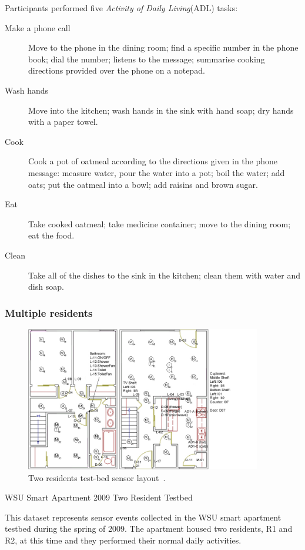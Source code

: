 \documentclass[12pt, a4paper, pdflatex, leqno, twoside, openright]{report}
\begin{document}
Participants performed five \emph{Activity of Daily Living}(ADL) tasks:
\begin{description}
\item[Make a phone call] Move to the phone in the dining room; find a specific number in the phone book; dial the number; listens to the message; summarise cooking directions provided over the phone on a notepad.
\item[Wash hands] Move into the kitchen; wash hands in the sink with hand soap; dry hands with a paper towel.
\item[Cook] Cook a pot of oatmeal according to the directions given in the phone message: measure water, pour the water into a pot; boil the water; add oats; put the oatmeal into a bowl; add raisins and brown sugar.
\item[Eat] Take cooked oatmeal; take medicine container; move to the dining room; eat the food.
\item[Clean] Take all of the dishes to the sink in the kitchen; clean them with water and dish soap.
\end{description}


      \subsubsection{Multiple residents}
\begin{figure}[htb]
  \centering%
  \includegraphics[height=6.3cm]{gfx/sensorlayoutTWOR.jpg}
  \caption[Two residents test-bed sensor layout.]{Two residents test-bed sensor layout~\citep{cook2009assessing}.\label{fig:twor}}
\end{figure}

WSU Smart Apartment 2009 Two Resident Testbed

This dataset represents sensor events collected in the WSU smart apartment testbed during the spring of 2009.  The apartment housed two residents, R1 and R2, at this time and they performed their normal daily activities.
\end{document}
